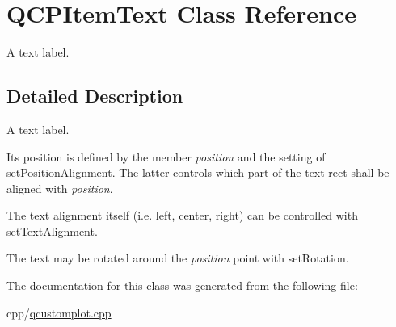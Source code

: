 \hypertarget{class_q_c_p_item_text}{}\section{Q\+C\+P\+Item\+Text Class Reference}
\label{class_q_c_p_item_text}


A text label.  




\subsection{Detailed Description}
A text label. 

 Its position is defined by the member {\itshape position} and the setting of set\+Position\+Alignment. The latter controls which part of the text rect shall be aligned with {\itshape position}.

The text alignment itself (i.\+e. left, center, right) can be controlled with set\+Text\+Alignment.

The text may be rotated around the {\itshape position} point with set\+Rotation. 

The documentation for this class was generated from the following file\+:\begin{DoxyCompactItemize}
\item 
cpp/\mbox{\hyperlink{qcustomplot_8cpp}{qcustomplot.\+cpp}}\end{DoxyCompactItemize}
